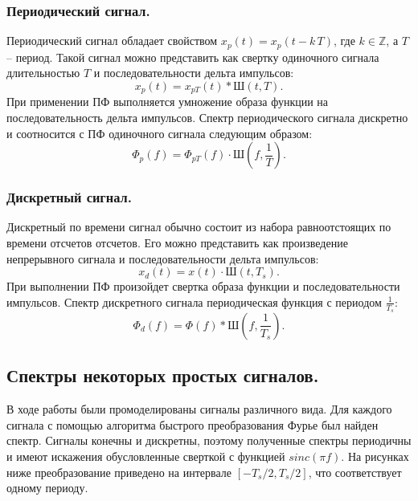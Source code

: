 \documentclass[a4paper,14pt]{extarticle}
\begin{document}
\subsubsection{Периодический сигнал.}

Периодический сигнал обладает свойством $x_p(t) = x_p(t - k\,T)$, где $ k \in \mathbb{Z}$, а $T$ -- период. Такой сигнал можно представить как свертку одиночного сигнала длительностью $T$ и последовательности дельта импульсов:
\begin{equation*}
x_p(t) = x_{pT}(t) * \text{Ш}(t, T).
\end{equation*}
При применении ПФ выполняется умножение образа функции на последовательность дельта импульсов. Спектр периодического сигнала дискретно и соотносится с ПФ одиночного сигнала следующим образом:
\begin{equation*}
\Phi_p(f) = \Phi_{pT}(f) \cdot \text{Ш}(f, \frac{1}{T}).
\end{equation*}

\subsubsection{Дискретный сигнал.}

Дискретный по времени сигнал обычно состоит из набора равноотстоящих по времени отсчетов отсчетов. Его можно представить как произведение непрерывного сигнала и последовательности дельта импульсов:
\begin{equation*}
x_d(t) = x(t) \cdot \text{Ш}(t, T_s).
\end{equation*}
При выполнении ПФ произойдет свертка образа функции и последовательности импульсов. Спектр дискретного сигнала периодическая функция с периодом $\frac{1}{T_s}$:
\begin{equation*}
\Phi_d(f) = \Phi(f) * \text{Ш}(f, \frac{1}{T_s}).
\end{equation*}

\subsection{Спектры некоторых простых сигналов.}

В ходе работы были промоделированы сигналы различного вида. Для каждого сигнала с помощью алгоритма быстрого преобразования Фурье был найден спектр. Сигналы конечны и дискретны, поэтому полученные спектры периодичны и имеют искажения обусловленные сверткой с функцией $sinc(\pi f)$. На рисунках ниже преобразование приведено на интервале $[-T_s / 2, T_s/2]$, что соответствует одному периоду.  
\end{document}
